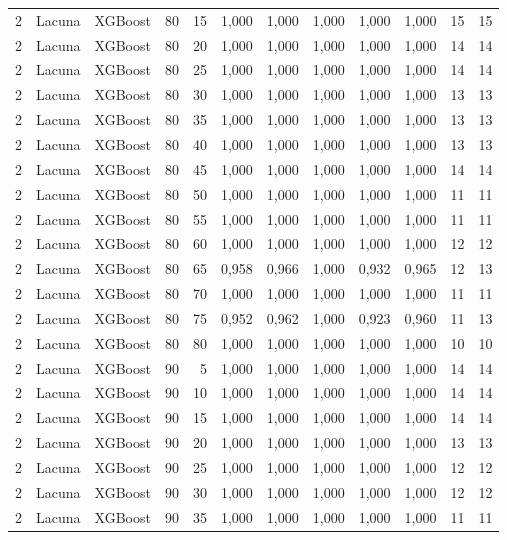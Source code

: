 \begin{longtable}{ccclrrrrrrrr}
2 & Lacuna & XGBoost & 80 & 15 & 1,000 & 1,000 & 1,000 & 1,000 & 1,000 & 15 & 15 \\
2 & Lacuna & XGBoost & 80 & 20 & 1,000 & 1,000 & 1,000 & 1,000 & 1,000 & 14 & 14 \\
2 & Lacuna & XGBoost & 80 & 25 & 1,000 & 1,000 & 1,000 & 1,000 & 1,000 & 14 & 14 \\
2 & Lacuna & XGBoost & 80 & 30 & 1,000 & 1,000 & 1,000 & 1,000 & 1,000 & 13 & 13 \\
2 & Lacuna & XGBoost & 80 & 35 & 1,000 & 1,000 & 1,000 & 1,000 & 1,000 & 13 & 13 \\
2 & Lacuna & XGBoost & 80 & 40 & 1,000 & 1,000 & 1,000 & 1,000 & 1,000 & 13 & 13 \\
2 & Lacuna & XGBoost & 80 & 45 & 1,000 & 1,000 & 1,000 & 1,000 & 1,000 & 14 & 14 \\
2 & Lacuna & XGBoost & 80 & 50 & 1,000 & 1,000 & 1,000 & 1,000 & 1,000 & 11 & 11 \\
2 & Lacuna & XGBoost & 80 & 55 & 1,000 & 1,000 & 1,000 & 1,000 & 1,000 & 11 & 11 \\
2 & Lacuna & XGBoost & 80 & 60 & 1,000 & 1,000 & 1,000 & 1,000 & 1,000 & 12 & 12 \\
2 & Lacuna & XGBoost & 80 & 65 & 0,958 & 0,966 & 1,000 & 0,932 & 0,965 & 12 & 13 \\
2 & Lacuna & XGBoost & 80 & 70 & 1,000 & 1,000 & 1,000 & 1,000 & 1,000 & 11 & 11 \\
2 & Lacuna & XGBoost & 80 & 75 & 0,952 & 0,962 & 1,000 & 0,923 & 0,960 & 11 & 13 \\
2 & Lacuna & XGBoost & 80 & 80 & 1,000 & 1,000 & 1,000 & 1,000 & 1,000 & 10 & 10 \\
2 & Lacuna & XGBoost & 90 & 5 & 1,000 & 1,000 & 1,000 & 1,000 & 1,000 & 14 & 14 \\
2 & Lacuna & XGBoost & 90 & 10 & 1,000 & 1,000 & 1,000 & 1,000 & 1,000 & 14 & 14 \\
2 & Lacuna & XGBoost & 90 & 15 & 1,000 & 1,000 & 1,000 & 1,000 & 1,000 & 14 & 14 \\
2 & Lacuna & XGBoost & 90 & 20 & 1,000 & 1,000 & 1,000 & 1,000 & 1,000 & 13 & 13 \\
2 & Lacuna & XGBoost & 90 & 25 & 1,000 & 1,000 & 1,000 & 1,000 & 1,000 & 12 & 12 \\
2 & Lacuna & XGBoost & 90 & 30 & 1,000 & 1,000 & 1,000 & 1,000 & 1,000 & 12 & 12 \\
2 & Lacuna & XGBoost & 90 & 35 & 1,000 & 1,000 & 1,000 & 1,000 & 1,000 & 11 & 11 \\

\end{longtable}
